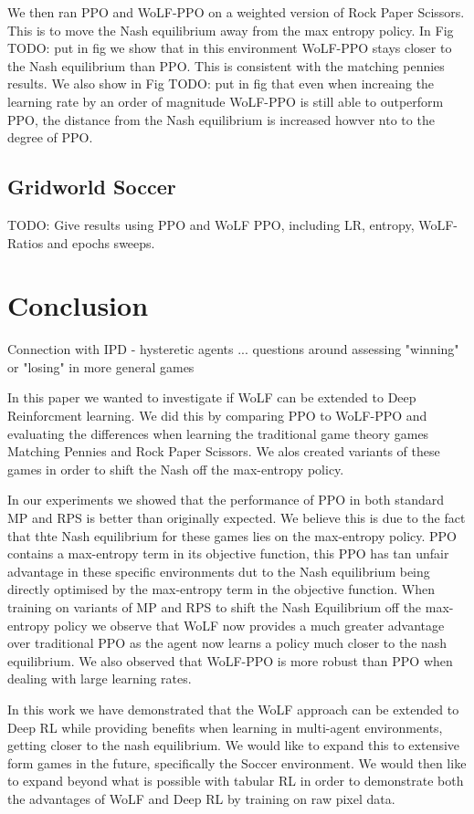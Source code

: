 \documentclass{article}
\newcommand\TODO[1]{{\color{red}TODO: #1}}
\begin{document}
We then ran PPO and WoLF-PPO on a weighted version of Rock Paper Scissors. This is to move the Nash equilibrium away from the max entropy policy. In Fig \TODO{put in fig} we show that in this environment WoLF-PPO stays closer to the Nash equilibrium than PPO. This is consistent with the matching pennies results. We also show in Fig \TODO{put in fig} that even when increaing the learning rate by an order of magnitude WoLF-PPO is still able to outperform PPO, the distance from the Nash equilibrium is increased howver nto to the degree of PPO.

\subsection{Gridworld Soccer}

\TODO{Give results using PPO and WoLF PPO, including LR, entropy, WoLF-Ratios and epochs sweeps.}

\section{Conclusion}

Connection with IPD - hysteretic agents ... questions around assessing "winning" or "losing" in more general games

In this paper we wanted to investigate if WoLF can be extended to Deep Reinforcment learning. We did this by comparing PPO to WoLF-PPO and evaluating the differences when learning the traditional game theory games Matching Pennies and Rock Paper Scissors. We alos created variants of these games in order to shift the Nash off the max-entropy policy.

In our experiments we showed that the performance of PPO in both standard MP and RPS is better than originally expected. We believe this is due to the fact that thte Nash equilibrium for these games lies on the max-entropy policy. PPO contains a max-entropy term in its objective function, this PPO has tan unfair advantage in these specific environments dut to the Nash equilibrium being directly optimised by the max-entropy term in the objective function. When training on variants of MP and RPS to shift the Nash Equilibrium off the max-entropy policy we observe that WoLF now provides a much greater advantage over traditional PPO as the agent now learns a policy much closer to the nash equilibrium. We also observed that WoLF-PPO is more robust than PPO when dealing with large learning rates.

In this work we have demonstrated that the WoLF approach can be extended to Deep RL while providing benefits when learning in multi-agent environments, getting closer to the nash equilibrium. We would like to expand this to extensive form games in the future, specifically the Soccer environment. We would then like to expand beyond what is possible with tabular RL in order to demonstrate both the advantages of WoLF and Deep RL by training on raw pixel data.
\end{document}
